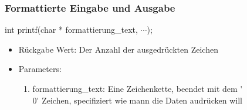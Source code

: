 \documentclass{article}[12pt]
\newenvironment{myexampleblock}[1]{%
    \tcolorbox[beamer,%
    noparskip,breakable,
    colback=White,colframe=ForestGreen,%
    colbacklower=LimeGreen!75!White,%
    title=#1]}%
    {\endtcolorbox}
\begin{document}
\subsubsection{Formattierte Eingabe und Ausgabe}
\begin{myexampleblock}{Function definition \texttt{printf}}
int printf(char * formattierung\_text, $\cdots$);
\begin{itemize}
\item Rückgabe Wert: Der Anzahl der ausgedrückten Zeichen
\item Parameters:
\begin{enumerate}
\item formattierung\_text: Eine Zeichenkette, beendet mit dem \'{}\\0\'{} Zeichen, specifiziert wie mann die Daten
audrücken will
\end{enumerate}
\end{itemize}
\end{myexampleblock}
\pagebreak



\end{document}
